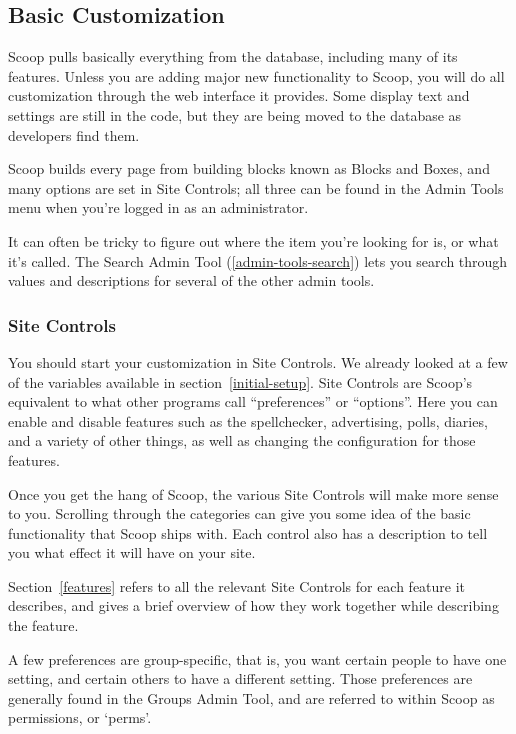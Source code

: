 \subsection{Basic Customization}
\label{how-start}

Scoop pulls basically everything from the database, including many of its features.  Unless you are adding major new functionality to Scoop, you will do all customization through the web interface it provides.  Some display text and settings are still in the code, but they are being moved to the database as developers find them.

Scoop builds every page from building blocks known as Blocks and Boxes, and many options are set in Site Controls; all three can be found in the Admin Tools menu when you're logged in as an administrator.

It can often be tricky to figure out where the item you're looking for is, or what it's called. The Search Admin Tool (\ref{admin-tools-search}) lets you search through values and descriptions for several of the other admin tools.

\subsubsection{Site Controls}
\label{how-vars}

You should start your customization in Site Controls.  We already looked at a few of the variables available in section~\ref{initial-setup}.  Site Controls are Scoop's equivalent to what other programs call ``preferences'' or ``options''.  Here you can enable and disable features such as the spellchecker, advertising, polls, diaries, and a variety of other things, as well as changing the configuration for those features.

Once you get the hang of Scoop, the various Site Controls will make more sense to you.   Scrolling through the categories can give you some idea of the basic functionality that Scoop ships with.  Each control also has a description to tell you what effect it will have on your site.

Section~\ref{features} refers to all the relevant Site Controls for each feature it describes, and gives a brief overview of how they work together while describing the feature.

A few preferences are group-specific, that is, you want certain people to have one setting, and certain others to have a different setting.  Those preferences are generally found in the Groups Admin Tool, and are referred to within Scoop as permissions, or `perms'.

